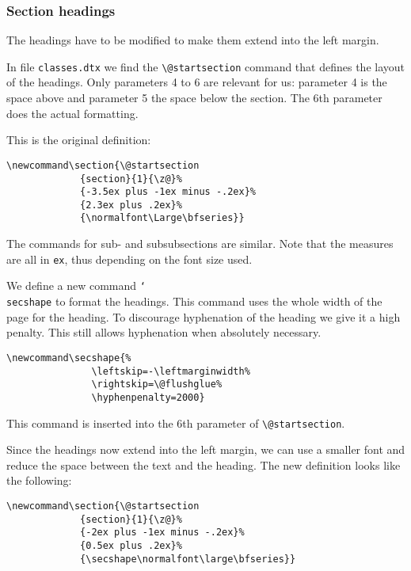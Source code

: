 \documentclass[twoside,a4paper]{refart}
\DeclareRobustCommand\cs[1]{\texttt{\char`\\#1}}
\begin{document}
\vspace{0pt plus 1cm}

\subsubsection{Section headings}

The headings have to be modified to make them extend into the left 
margin.

In file \texttt{classes.dtx} we find the \verb|\@startsection| command 
that defines the layout of the headings. Only parameters 4 to 6 are 
relevant for us: parameter 4 is the space above and parameter 5 the 
space below the section. The 6th parameter does the actual formatting.

This is the original definition:\nopagebreak
\begin{verbatim}
\newcommand\section{\@startsection
             {section}{1}{\z@}%
             {-3.5ex plus -1ex minus -.2ex}%
             {2.3ex plus .2ex}%
             {\normalfont\Large\bfseries}}
\end{verbatim}

The commands for sub- and subsubsections are similar. Note that the 
measures are all in \texttt{ex}, thus depending on the font size used.

We define a new command \cs{secshape} to format the headings. This 
command uses the whole width of the page for the heading. To discourage 
hyphenation of the heading we give it a high penalty. This still 
allows hyphenation when absolutely necessary.

\begin{verbatim}
\newcommand\secshape{%
               \leftskip=-\leftmarginwidth%
               \rightskip=\@flushglue%
               \hyphenpenalty=2000}
\end{verbatim}

This command is inserted into the 6th parameter of \verb|\@startsection|.

Since the headings now extend into the left margin, we can use a 
smaller font and reduce the space between the text and the heading. The 
new definition looks like the following:\nopagebreak
\begin{verbatim}
\newcommand\section{\@startsection
             {section}{1}{\z@}%
             {-2ex plus -1ex minus -.2ex}%
             {0.5ex plus .2ex}%
             {\secshape\normalfont\large\bfseries}}
\end{verbatim}
\end{document}

